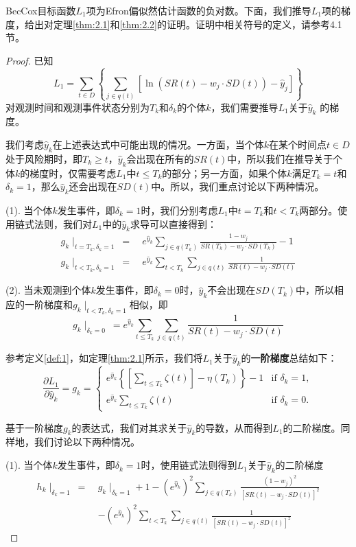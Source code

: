 BecCox目标函数$L_1$项为Efron偏似然估计函数的负对数。下面，我们推导$L_1$项的梯度，给出对定理\ref{thm:2.1}和\ref{thm:2.2}的证明。证明中相关符号的定义，请参考4.1节。
\begin{proof}
已知$$L_1 = \sum_{t\in D} \left\{ \sum_{j\in q(t)} [\ln(SR(t)-w_j\cdot SD(t))-\hat{y}_j] \right\}$$ 对观测时间和观测事件状态分别为$T_k$和$\delta_k$的个体$k$，我们需要推导$L_1$关于$\hat{y}_k$ 的梯度。

我们考虑$\hat{y}_k$在上述表达式中可能出现的情况。一方面，当个体$k$在某个时间点$t\in D$处于风险期时，即$T_k\ge t$，$\hat{y}_k$会出现在所有的$SR(t)$中，所以我们在推导关于个体$k$的梯度时，仅需要考虑$L_1$中$t \le T_k$的部分；另一方面，如果个体$k$满足$T_k=t$和$\delta_k=1$，那么$\hat{y}_k$还会出现在$SD(t)$中。所以，我们重点讨论以下两种情况。

(1). 当个体$k$发生事件，即$\delta_k=1$时，我们分别考虑$L_1$中$t=T_k$和$t<T_k$两部分。使用链式法则，我们对$L_1$中的$\hat{y}_k$求导可以直接得到：\[
\begin{split}
g_k\mid_{t=T_k,\delta_k=1} \ =\ & e^{\hat{y}_k}\sum_{j\in q(T_k)} \frac{1-w_j}{SR(T_k) - w_j\cdot SD(T_k)} - 1 \\
g_k\mid_{t<T_k,\delta_k=1} \ =\ & e^{\hat{y}_k}\sum_{t<T_k} \sum_{j\in q(t)} \frac{1}{SR(t) - w_j\cdot SD(t)}
\end{split}
\]

(2). 当未观测到个体$k$发生事件，即$\delta_k=0$时，$\hat{y}_k$不会出现在$SD(T_k)$中，所以相应的一阶梯度和$g_k\mid_{t<T_k,\delta_k=1}$相似，即$$
g_k\mid_{\delta_k=0} \ = e^{\hat{y}_k}\sum_{t\le T_k} \sum_{j\in q(t)} \frac{1}{SR(t) - w_j\cdot SD(t)}
$$

参考定义\ref{def:1}，如定理\ref{thm:2.1}所示，我们将$L_1$关于$\hat{y}_k$的\textbf{一阶梯度}总结如下：$$
\frac{\partial L_1}{\partial \hat{y}_k} = g_k = 
\begin{cases}
e^{\hat{y}_k} \left\{ \left[\sum_{t\le T_k} \zeta(t)\right] - \eta(T_k) \right\} - 1 & \text{if } \delta_k = 1,\\
e^{\hat{y}_k} \sum_{t\le T_k} \zeta(t) & \text{if } \delta_k = 0.
\end{cases}
$$

基于一阶梯度$g_k$的表达式，我们对其求关于$\hat{y}_k$的导数，从而得到$L_1$的二阶梯度。同样地，我们讨论以下两种情况。

(1). 当个体$k$发生事件，即$\delta_k=1$时，使用链式法则得到$L_1$关于$\hat{y}_k$的二阶梯度\[
\begin{split}
h_k\mid_{\delta_k=1}\ =\ & g_k\mid_{\delta_k=1} + 1 - (e^{\hat{y}_k})^2 \sum_{j\in q(T_k)} \frac{(1-w_j)^2}{[SR(t) - w_j\cdot SD(t)]^2} \\
   & -(e^{\hat{y}_k})^2 \sum_{t< T_k} \sum_{j\in q(t)} \frac{1}{[SR(t) - w_j\cdot SD(t)]^2}
\end{split}
\]


\end{proof}
